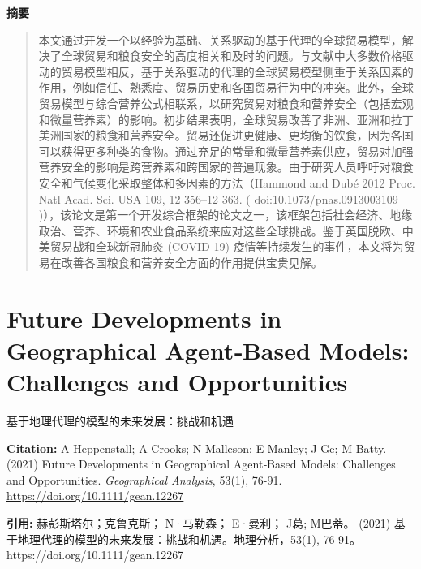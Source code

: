 \noindent\textbf{摘要}\par
\begin{quote}\small
本文通过开发一个以经验为基础、关系驱动的基于代理的全球贸易模型，解决了全球贸易和粮食安全的高度相关和及时的问题。与文献中大多数价格驱动的贸易模型相反，基于关系驱动的代理的全球贸易模型侧重于关系因素的作用，例如信任、熟悉度、贸易历史和各国贸易行为中的冲突。此外，全球贸易模型与综合营养公式相联系，以研究贸易对粮食和营养安全（包括宏观和微量营养素）的影响。初步结果表明，全球贸易改善了非洲、亚洲和拉丁美洲国家的粮食和营养安全。贸易还促进更健康、更均衡的饮食，因为各国可以获得更多种类的食物。通过充足的常量和微量营养素供应，贸易对加强营养安全的影响是跨营养素和跨国家的普遍现象。由于研究人员呼吁对粮食安全和气候变化采取整体和多因素的方法（Hammond and Dubé 2012 Proc. Natl Acad. Sci. USA 109, 12 356–12 363. ( doi:10.1073/pnas.0913003109 )），该论文是第一个开发综合框架的论文之一，该框架包括社会经济、地缘政治、营养、环境和农业食品系统来应对这些全球挑战。鉴于英国脱欧、中美贸易战和全球新冠肺炎 (COVID-19) 疫情等持续发生的事件，本文将为贸易在改善各国粮食和营养安全方面的作用提供宝贵见解。
\end{quote}

\vspace{0.5em}


\chapter{Future Developments in Geographical Agent‐Based Models: Challenges and Opportunities}
\begin{center}\small 基于地理代理的模型的未来发展：挑战和机遇\end{center}

\noindent\textbf{Citation:} A Heppenstall; A Crooks; N Malleson; E Manley; J Ge; M Batty. (2021) Future Developments in Geographical Agent‐Based Models: Challenges and Opportunities. \textit{Geographical Analysis}, 53(1), 76-91. \url{https://doi.org/10.1111/gean.12267}

\vspace{0.5em}
\noindent\textbf{引用:} 赫彭斯塔尔；克鲁克斯； N·马勒森； E·曼利； J葛; M巴蒂。 (2021) 基于地理代理的模型的未来发展：挑战和机遇。地理分析，53(1), 76-91。 https://doi.org/10.1111/gean.12267

